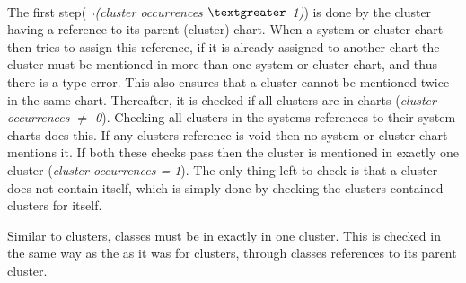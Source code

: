 \paragraph{}
The first step({\footnotesize$\neg$\textit{(cluster occurrences $\textgreater$ 1)}}) is done by the cluster having a reference to its parent (cluster) chart. When a system or cluster chart then tries to assign this reference, if it is already assigned to another chart the cluster must be mentioned in more than one system or cluster chart, and thus there is a type error. This also ensures that a cluster cannot be mentioned twice in the same chart. Thereafter, it is checked if all clusters are in charts ({\footnotesize\textit{cluster occurrences $\neq$ 0}}). Checking all clusters in the systems references to their system charts does this. If any clusters reference is void then no system or cluster chart mentions it. If both these checks pass then the cluster is mentioned in exactly one cluster ({\footnotesize\textit{cluster occurrences = 1}}). The only thing left to check is that a cluster does not contain itself, which is simply done by checking the clusters contained clusters for itself. 

Similar to clusters, classes must be in exactly in one cluster. This is checked in the same way as the as it was for clusters, through classes references to its parent cluster.